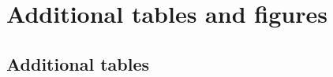 
\chapter{Additional tables and figures}
\label{cha:add-tf}


\ifpdf
    \graphicspath{{9_backmatter/figures/PNG/}{9_backmatter/figures/PDF/}{9_backmatter/figures/}}
\else
    \graphicspath{{9_backmatter/figures/EPS/}{9_backmatter/figures/}}
\fi

\section{Additional tables}



